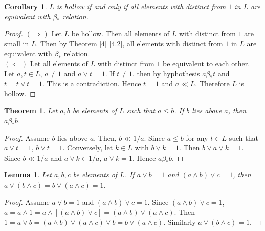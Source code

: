 \documentclass[11pt,reqno]{amsart} %
\theoremstyle{plain}
\newtheorem{theorem}{Theorem}
\newtheorem{lemma}{Lemma}
\newtheorem{corollary}{Corollary}
\theoremstyle{definition}
\theoremstyle{remark}
\numberwithin{equation}{section}
\begin{document}
\begin{corollary} \label{5}
  $ L $ is hollow if and only if all elements with distinct from $ 1 $ in $ L $ are equivalent with $ \beta_* $ relation. 
\end{corollary}
\begin{proof}
  $ ( \Rightarrow ) $
  Let $ L $ be hollow. Then all elements of $ L $ with distinct from $ 1 $ are small in $ L $. Then by Theorem \ref{4} \ref{4.2}, 
  all elements with distinct from $ 1 $ in $ L $ are equivalent with $ \beta_* $ relation. \\
  $ ( \Leftarrow ) $ 
  Let all elements of $ L $ with distinct from $ 1 $ be equivalent to each other. Let $a,t \in L $, $ a \neq 1 $ and $ a \vee t = 1 $. 
  If $ t \neq 1 $, then by hyphothesis $ a \beta_* t $ and $ t = t \vee t = 1 $. This is a contradiction. Hence $ t = 1 $ and
  $ a \ll L $.
  Therefore $ L $ is hollow. 
\end{proof}
\begin{theorem}\label{6}
  Let $ a,b $ be elements of $ L $ such that $ a \leq b $. 
  If $ b $ lies above $ a $, then $ a \beta_* b $. 
\end{theorem}
\begin{proof}
  Assume $ b $ lies above $ a $. Then, $ b \ll 1/a $. Since $ a \leq b $ for any $ t \in L $ such that $ a \vee t = 1 $, $ b \vee t = 1 $. 
  Conversely, let $ k \in L $ with $ b \vee k = 1 $. Then $ b \vee a \vee k = 1 $. Since $ b \ll 1/a $ and $ a \vee k \in 1/a $, $ a \vee k = 1 $. Hence $ a \beta_* b $.


\end{proof}
\begin{lemma}\label{7}
  Let $ a,b,c $ be elements of $ L $.
  If $ a \vee b = 1 $ and $ ( a \wedge b ) \vee c =1 $,
  then $ a \vee(b \wedge c)=b \vee ( a \wedge c ) = 1 $.
\end{lemma}
\begin{proof}
  Assume $ a \vee b = 1 $ and $ ( a \wedge b ) \vee c = 1 $. Since $ ( a \wedge b ) \vee c = 1 $, $ a = a \wedge 1 = a \wedge \left[ ( a\wedge b ) \vee c \right]= ( a \wedge b ) \vee ( a \wedge c ) $. Then $ 1 = a\vee b = ( a \wedge b ) \vee ( a \wedge c ) \vee b = b \vee ( a \wedge c )$. Similarly $ a \vee ( b \wedge c ) = 1 $.
\end{proof}
\end{document}

